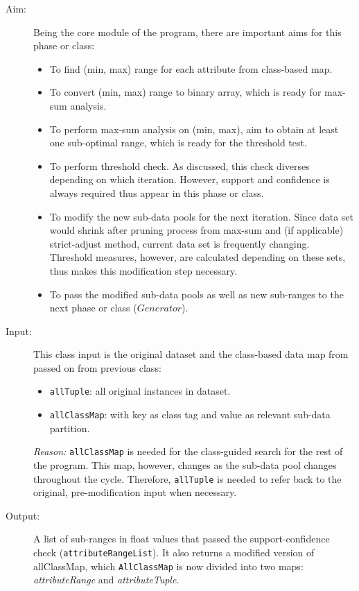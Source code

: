 \begin{description}

\item[Aim: ] Being the core module of the program, there are important aims for this phase or class:
\begin{itemize}
	\item{To find (min, max) range for each attribute from class-based map.} 
	\item{To convert (min, max) range to binary array, which is ready for max-sum analysis.} 
	\item{To perform max-sum analysis on (min, max), aim to obtain at least one sub-optimal range, which is ready for the threshold test.} 
	\item{To perform threshold check. As discussed, this check diverses depending on which iteration. However, support and confidence is always required thus appear in this phase or class.} 
	\item{To modify the new sub-data pools for the next iteration. Since data set would shrink after pruning process from max-sum and (if applicable) strict-adjust method, current data set is frequently changing. Threshold measures, however, are calculated depending on these sets, thus makes this modification step necessary.} 
	\item{To pass the modified sub-data pools as well as new sub-ranges to the next phase or class ($Generator$).} 
\end{itemize}


\item[Input: ] This class input is the original dataset and the class-based data map from passed on from previous class:
\begin{itemize}
	\item{\texttt{allTuple}:  all original instances in dataset.} 
	\item{\texttt{allClassMap}: with key as class tag and value as relevant sub-data partition.}
\end{itemize}

\textit{Reason: } \texttt{allClassMap} is needed for the class-guided search for the rest of the program. This map, however, changes as the sub-data pool changes throughout the cycle. Therefore, \texttt{allTuple} is needed to refer back to the original, pre-modification input when necessary.

\item[Output: ] A list of sub-ranges in float values that passed the support-confidence check (\texttt{attributeRangeList}). It also returns a modified version of allClassMap, which \texttt{AllClassMap} is now divided into two maps: \textit{attributeRange} and \textit{attributeTuple}.
  

\end{description}
